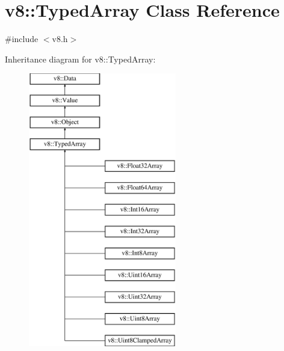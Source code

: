 \hypertarget{classv8_1_1_typed_array}{}\section{v8\+:\+:Typed\+Array Class Reference}
\label{classv8_1_1_typed_array}


{\ttfamily \#include $<$v8.\+h$>$}

Inheritance diagram for v8\+:\+:Typed\+Array\+:\begin{figure}[H]
\begin{center}
\leavevmode
\includegraphics[height=12.000000cm]{classv8_1_1_typed_array}
\end{center}
\end{figure}
